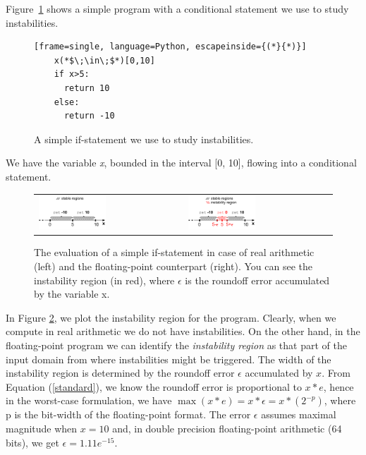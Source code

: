 Figure~\ref{fig:ifstatement} shows a simple program with a conditional statement we use to study instabilities.
%
\begin{figure}[b!]
	\begin{lstlisting}[frame=single, language=Python, escapeinside={(*}{*)}]
	x(*$\;\in\;$*)[0,10]
	if x>5:
	  return 10
	else:
	  return -10	
	\end{lstlisting}
	\caption{A simple if-statement we use to study instabilities.}\label{fig:ifstatement}
\end{figure}
%
We have the variable \emph{x}, bounded in the interval [0, 10], flowing into a conditional statement.
%
\begin{figure}[tb!]
	\centering
	\begin{tabular}{ll}
		\includegraphics[width=0.48\textwidth]{pic/ifreal.png}
		&
		\includegraphics[width=0.48\textwidth]{pic/iffp.png}
	\end{tabular}
	\caption{The evaluation of a simple if-statement in case of real arithmetic (left) and the floating-point counterpart (right). You can see the instability region (in red), where $\epsilon$ is the roundoff error accumulated by the variable x.}
	\label{fig:ifreal}
\end{figure}
%
In Figure \ref{fig:ifreal}, we plot the instability region for the program. Clearly, when we compute in real arithmetic we do not have instabilities. On the other hand, in the floating-point program we can identify the \emph{instability region} as that part of the input domain from where instabilities might be triggered.
%
The width of the instability region is determined by the roundoff error $\epsilon$ accumulated by $x$. From Equation (\ref{standard}), we know the roundoff error is proportional to $x*e$, hence in the worst-case formulation, we have $\max(x*e) = x*\epsilon = x*(2^{-p})$, where p is the bit-width of the floating-point format. The error $\epsilon$ assumes maximal magnitude when $x=10$ and, in double precision floating-point arithmetic (64 bits), we get $\epsilon=1.11e^{-15}$.
%


